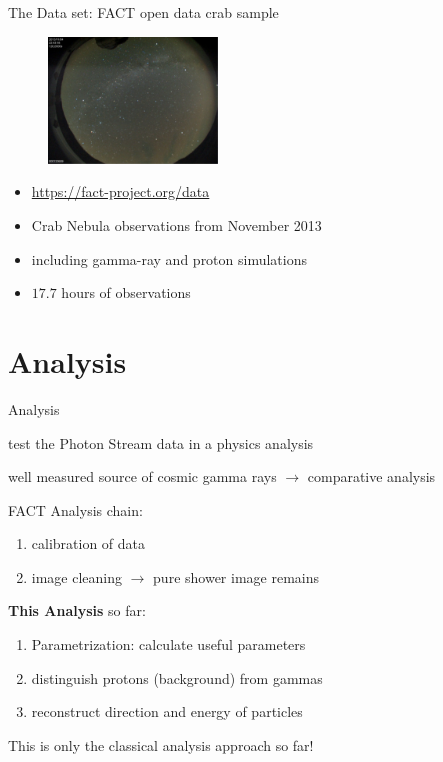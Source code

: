 \begin{frame}[t]{The Data set: FACT open data crab sample}
    \begin{multicols}{2}
        \begin{figure}
            \centering
            \includegraphics[width=0.4\textwidth]{fig/cond.png}
        \end{figure}
    \columnbreak
    \vspace*{\fill}
        \begin{itemize}
            \item \url{https://fact-project.org/data}
            \item Crab Nebula observations from November 2013
            \item including gamma-ray and proton simulations
            \item $17.7$ hours of observations
        \end{itemize}
    \vspace*{\fill}
  \end{multicols}
\end{frame}

\section{Analysis}

\begin{frame}[t]{Analysis}
\begin{description}
    \item[aim] test the Photon Stream data in a physics analysis 
    \item[Crab Nebula] well measured source of cosmic gamma rays $\rightarrow$ comparative analysis
\end{description}
FACT Analysis chain:
    \begin{enumerate}
        \item calibration of data
        \item image cleaning $\rightarrow$ pure shower image remains
    \end{enumerate}
\textbf{{\color{tugreen} This Analysis}} so far:
    \begin{enumerate}\addtocounter{enumi}{2}
        \item Parametrization: calculate useful parameters
        \item distinguish protons (background) from gammas
        \item reconstruct direction and energy of particles
    \end{enumerate}
\begin{framed}
    \centering
    This is only the classical analysis approach so far!
\end{framed}
\end{frame}

